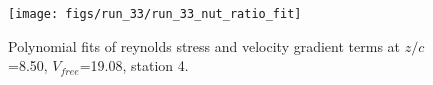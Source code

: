 \begin{figure}[H]
\centering
\texttt{[image: figs/run\_33/run\_33\_nut\_ratio\_fit]}
\caption{Polynomial fits of reynolds stress and velocity gradient terms at $z/c$=8.50, $V_{free}$=19.08, station 4.}
\label{fig:run_33_nut_ratio_fit}
\end{figure}


